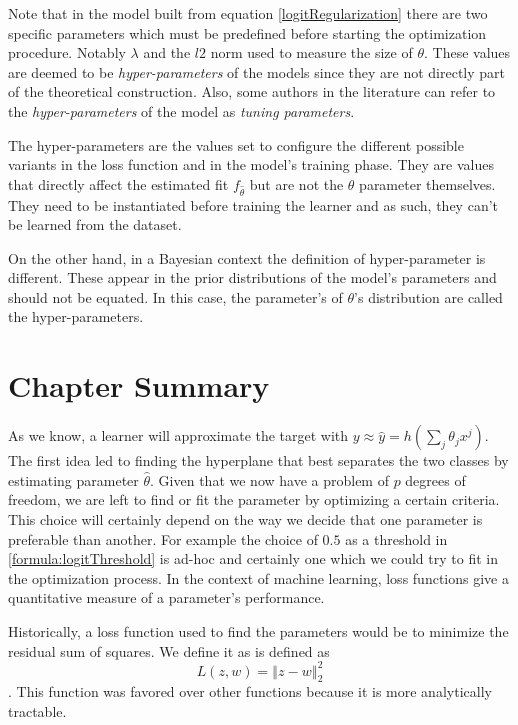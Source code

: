 Note that in the model built from equation \cref{logitRegularization} there are two specific parameters which must be predefined before starting the optimization procedure. Notably $\lambda$ and the $l2$ norm used to measure the size of $\theta$. These values are deemed to be \textit{hyper-parameters} of the models since they are not directly part of the theoretical construction. Also, some authors in the literature can refer to the \textit{hyper-parameters} of the model as \textit{tuning parameters}.

The hyper-parameters are the values set to configure the different possible variants in the loss function and in the model's training phase. They are values that directly affect the estimated fit $f_{\hat{\theta}}$ but are not the $\theta$ parameter themselves. They need to be instantiated before training the learner and as such, they can't be learned from the dataset.

On the other hand, in a Bayesian context the definition of hyper-parameter is different. These appear in the prior distributions of the model's parameters and should not be equated. In this case, the parameter's of $\theta$'s distribution are called the hyper-parameters.




\section{Chapter Summary}\label{section-ch_machine_learning_summary}

As we know, a learner will approximate the target with $y \approx \hat{y} = h\left(\sum_{j}\theta_j x^j\right)$. The first idea led to finding the hyperplane that best separates the two classes by estimating parameter $\hat{\theta}$. Given that we now have a problem of $p$ degrees of freedom, we are left to find or fit the parameter by optimizing a certain criteria. This choice will certainly depend on the way we decide that one parameter is preferable than another. For example the choice of $0.5$ as a threshold in \cref{formula:logitThreshold} is ad-hoc and certainly one which we could try to fit in the optimization process. In the context of machine learning, loss functions give a quantitative measure of a parameter's performance.

Historically, a loss function used to find the parameters would be to minimize the residual sum of squares. 
We define it as is defined as $$L(z,w) = \left\Vert z-w \right\Vert^2_2$$. 
This function was favored over other functions because it is more analytically tractable. 

